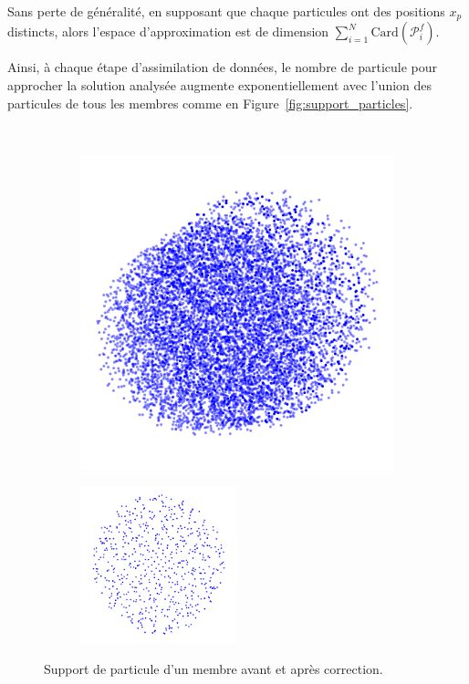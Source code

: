 Sans perte de généralité, en supposant que chaque particules ont des positions $x_p$ distincts, alors l'espace d'approximation est de dimension $\sum_{i=1}^{N} \text{Card}(\mathcal{P}^f_i)$.

Ainsi, à chaque étape d'assimilation de données, le nombre de particule pour approcher la solution analysée augmente exponentiellement avec l'union des particules de tous les membres comme en Figure~\ref{fig:support_particles}.

\begin{figure}~\label{fig:support_particles}
    \centering
    \begin{subfigure}{0.5\textwidth}
        \includegraphics[width=\textwidth]{./images/all_particles.pdf}
    \end{subfigure}
    \begin{subfigure}{0.5\textwidth}
        \includegraphics[width=0.5\textwidth]{./images/memb_particles.pdf}
    \end{subfigure}
    \caption{Support de particule d'un membre avant et après correction.}
\end{figure}

